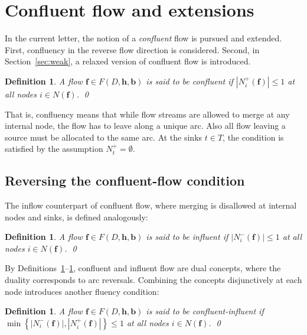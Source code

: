 \documentclass[pdflatex,sn-mathphys-num]{sn-jnl}%
\theoremstyle{thmstyleone}%
\newtheorem{definition}[theorem]{Definition}%
\begin{document}
\section{Confluent flow and extensions} \label{sec:conf}
In the current letter, the notion of a \emph{confluent} flow \cite{chen06} is pursued and extended.
First, confluency in the reverse flow direction is considered.
Second, in Section~\ref{sec:weak}, a relaxed version of confluent flow is introduced.
\begin{definition} \label{def:conf}
A flow $\boldsymbol{f}\in F(D,\boldsymbol{h},\boldsymbol{b})$ is said to be \emph{confluent} if $|N_i^+(\boldsymbol{f})|\leq 1$ at all nodes $i\in N(\boldsymbol{f})$.
\qed
\end{definition}

That is, confluency means that while flow streams are allowed to merge at any internal node, the flow has to leave along a unique arc.
Also all flow leaving a source must be allocated to the same arc. At the sinks $t\in T$, the condition is satisfied by the assumption $N_t^+=\emptyset$.

\subsection{Reversing the confluent-flow condition} \label{sec:inf}
The inflow counterpart of confluent flow, where merging is disallowed at internal nodes and sinks, is defined analogously:
\begin{definition} \label{def:inf}
A flow $\boldsymbol{f}\in F(D,\boldsymbol{h},\boldsymbol{b})$ is said to be \emph{influent} if $|N_i^-(\boldsymbol{f})|\leq 1$ at all nodes $i\in N(\boldsymbol{f})$.
\qed
\end{definition}

By Definitions~\ref{def:conf}--\ref{def:inf}, confluent and influent flow are dual concepts, where the duality corresponds to arc reversals.
Combining the concepts disjunctively at each node introduces another fluency condition:
\begin{definition} \label{def:confinf}
A flow $\boldsymbol{f}\in F(D,\boldsymbol{h},\boldsymbol{b})$ is said to be \emph{confluent-influent} if
$\min\left\{|N_i^-(\boldsymbol{f})|,|N_i^+(\boldsymbol{f})|\right\}\leq 1$ at all nodes $i\in N(\boldsymbol{f})$.
\qed
\end{definition}
\end{document}
